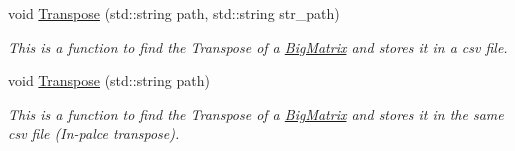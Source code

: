 \begin{DoxyCompactItemize}
void \hyperlink{classMATOPS_1_1BigMatrix_a3d3ca40bb701fbc884c6b603dd95e753}{Transpose} (std\+::string path, std\+::string str\+\_\+path)
\begin{DoxyCompactList}\small\item\em This is a function to find the Transpose of a \hyperlink{classMATOPS_1_1BigMatrix}{Big\+Matrix} and stores it in a csv file. \end{DoxyCompactList}\item 
void \hyperlink{classMATOPS_1_1BigMatrix_a1a6d446f0a7e13eae2de1c6702acd706}{Transpose} (std\+::string path)
\begin{DoxyCompactList}\small\item\em This is a function to find the Transpose of a \hyperlink{classMATOPS_1_1BigMatrix}{Big\+Matrix} and stores it in the same csv file (In-\/palce transpose). \end{DoxyCompactList}\end{DoxyCompactItemize}
